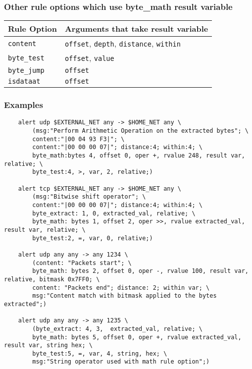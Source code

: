 \documentclass[english]{report}
\begin{document}
\subsubsection{Other rule options which use byte\_math result variable}

\begin{tabular}{| l | p{4.5in} |}
\hline
{\bf Rule Option} & {\bf Arguments that take result variable}\\
\hline
\hline
\texttt{content} & \texttt{offset}, \texttt{depth},
\texttt{distance}, \texttt{within}\\
\hline
\texttt{byte\_test} & \texttt{offset}, \texttt{value}\\
\hline
\texttt{byte\_jump} & \texttt{offset}\\
\hline
\texttt{isdataat} & \texttt{offset}\\
\hline
\end{tabular}


\subsubsection{Examples}

\begin{verbatim}
    alert udp $EXTERNAL_NET any -> $HOME_NET any \
        (msg:"Perform Arithmetic Operation on the extracted bytes"; \
        content:"|00 04 93 F3|"; \
        content:"|00 00 00 07|"; distance:4; within:4; \
        byte_math:bytes 4, offset 0, oper +, rvalue 248, result var, relative; \
        byte_test:4, >, var, 2, relative;)

    alert tcp $EXTERNAL_NET any -> $HOME_NET any \
        (msg:"Bitwise shift operator"; \
        content:"|00 00 00 07|"; distance:4; within:4; \
        byte_extract: 1, 0, extracted_val, relative; \
        byte_math: bytes 1, offset 2, oper >>, rvalue extracted_val, result var, relative; \
        byte_test:2, =, var, 0, relative;)

    alert udp any any -> any 1234 \
        (content: "Packets start"; \
        byte_math: bytes 2, offset 0, oper -, rvalue 100, result var, relative, bitmask 0x7FF0; \
        content: "Packets end"; distance: 2; within var; \
        msg:"Content match with bitmask applied to the bytes extracted";)

    alert udp any any -> any 1235 \
        (byte_extract: 4, 3,  extracted_val, relative; \
        byte_math: bytes 5, offset 0, oper +, rvalue extracted_val, result var, string hex; \
        byte_test:5, =, var, 4, string, hex; \
        msg:"String operator used with math rule option";)

\end{verbatim}
\end{document}
